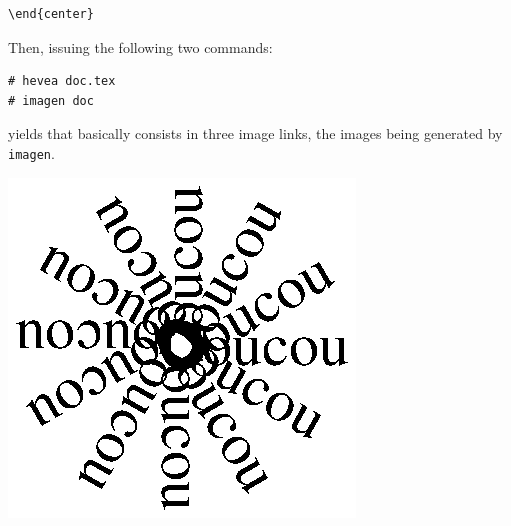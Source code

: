 \begin{verbatim}
\end{center}
\end{verbatim}
Then, issuing the following two commands:
\begin{verbatim}
# hevea doc.tex
# imagen doc
\end{verbatim}
yields \html{} that basically consists in three image links,
the images being generated by \texttt{imagen}.
\ifhevea
\begin{htmlout}
\begin{center}
\includegraphics{round.ps}
\end{center}
\end{htmlout}
\fi

